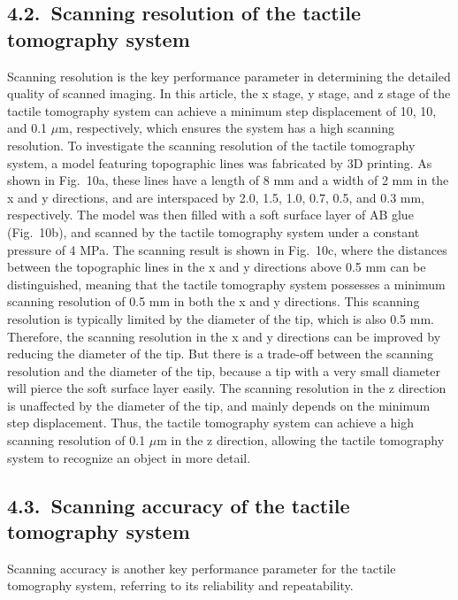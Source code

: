 \documentclass[11pt]{article}
\begin{document}
\subsection*{4.2.\ Scanning resolution of the tactile tomography system}

Scanning resolution is the key performance parameter in determining
the detailed quality of scanned imaging. In this article, the x
stage, y stage, and z stage of the tactile tomography system can
achieve a minimum step displacement of 10, 10, and 0.1 $\mu$m,
respectively, which ensures the system has a high scanning
resolution. To investigate the scanning resolution of the tactile
tomography system, a model featuring topographic lines was
fabricated by 3D printing. As shown in Fig.~10a, these lines have
a length of 8 mm and a width of 2 mm in the x and y directions,
and are interspaced by 2.0, 1.5, 1.0, 0.7, 0.5, and 0.3 mm,
respectively. The model was then filled with a soft surface layer
of AB glue (Fig.~10b), and scanned by the tactile tomography system
under a constant pressure of 4 MPa. The scanning result is shown
in Fig.~10c, where the distances between the topographic lines in
the x and y directions above 0.5 mm can be distinguished, meaning
that the tactile tomography system possesses a minimum scanning
resolution of 0.5 mm in both the x and y directions. This scanning
resolution is typically limited by the diameter of the tip, which
is also 0.5 mm. Therefore, the scanning resolution in the x and y
directions can be improved by reducing the diameter of the tip.
But there is a trade-off between the scanning resolution and the
diameter of the tip, because a tip with a very small diameter will
pierce the soft surface layer easily. The scanning resolution in
the z direction is unaffected by the diameter of the tip, and
mainly depends on the minimum step displacement. Thus, the tactile
tomography system can achieve a high scanning resolution of 0.1
$\mu$m in the z direction, allowing the tactile tomography system
to recognize an object in more detail.

\subsection*{4.3.\ Scanning accuracy of the tactile tomography system}

Scanning accuracy is another key performance parameter for the
tactile tomography system, referring to its reliability and
repeatability.

\newpage
\end{document}

